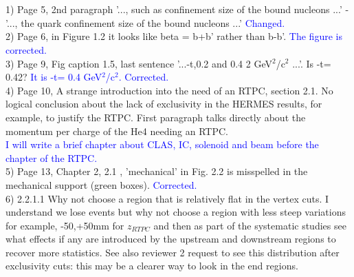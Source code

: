 \section*{}

1) Page 5, 2nd paragraph
'..., such as confinement size of the bound nucleons ...' - '..., the quark 
confinement size of the bound nucleons ...'
\textcolor{blue}{ Changed.}\\

2) Page 6, in Figure 1.2 it looks like beta = b+b' rather than b-b'.
\textcolor{blue}{ The figure is corrected.}\\

3) Page 9, Fig caption 1.5, last sentence  '...-t,0.2 and 0.4  2 
GeV$^{2}$/c$^{2}$ ...'.  Is -t= 0.42?
\textcolor{blue}{ It is -t= 0.4 GeV$^{2}$/c$^{2}$. Corrected.}\\

4) Page 10, A strange introduction into the need of an RTPC, section 2.1. No 
logical conclusion about the lack of exclusivity in the HERMES results, for 
example, to justify the RTPC. First paragraph talks directly about the momentum 
per charge of the He4 needing an RTPC.\\
\textcolor{blue}{I will write a brief chapter about CLAS, IC, solenoid and beam 
before the chapter of the RTPC.}\\

5) Page 13, Chapter 2,  2.1 ,  'mechanical'  in Fig. 2.2 is misspelled in the mechanical support (green boxes).
\textcolor{blue}{ Corrected.}\\

6) 2.2.1.1 Why not choose a region that is relatively flat in the vertex cuts. I 
understand we lose events but why not choose a region with less steep 
variations for example, -50,+50mm for $z_{RTPC}$ and then as part of the 
systematic studies see what effects if any are introduced by the upstream and 
downstream regions to recover more statistics. See also reviewer 2 request to 
see this distribution after exclusivity cuts: this may be a clearer way to look 
in the end regions. \\

